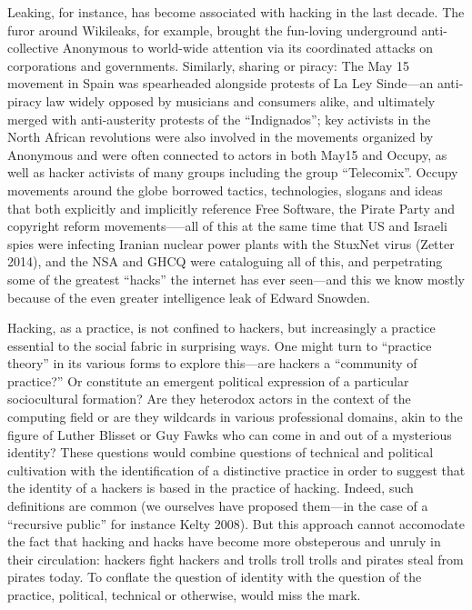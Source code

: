 \documentclass[10pt,letter,oneside]{scrartcl}
\begin{document}
Leaking, for instance, has become associated with hacking in the last decade.
The furor around Wikileaks, for example, brought the fun-loving underground
anti-collective Anonymous to world-wide attention via its coordinated attacks on
corporations and governments.  Similarly, sharing or piracy: The May 15 movement
in Spain was spearheaded alongside protests of La Ley Sinde---an anti-piracy law
widely opposed by musicians and consumers alike, and ultimately merged with
anti-austerity protests of the ``Indignados''; key activists in the North African
revolutions were also involved in the movements organized by Anonymous and were 
often connected to actors in both May15 and Occupy, as well as hacker activists
of many groups including the group ``Telecomix''.  Occupy movements around the 
globe borrowed tactics, technologies, slogans and ideas that both explicitly and
 implicitly reference Free Software, the Pirate Party and copyright reform
movements—--all of this at the same time that US and Israeli spies were
infecting Iranian nuclear power plants with the StuxNet virus (Zetter 2014), and
the NSA and GHCQ were cataloguing all of this, and perpetrating some of the
greatest ``hacks'' the internet has ever seen---and this we know mostly because of
the even greater intelligence leak of Edward Snowden.

Hacking, as a practice, is not confined to hackers, but increasingly a practice
essential to the social fabric in surprising ways.  One might turn to ``practice
theory'' in its various forms to explore this---are hackers a ``community of
practice?'' Or constitute an emergent political expression of a particular 
sociocultural formation? Are they heterodox actors in the context of the computing
field or are they wildcards in various professional domains, akin to the figure of
Luther Blisset or Guy Fawks who can come in and out of a mysterious identity?  
These questions would combine questions of technical and political cultivation with
the identification of a distinctive practice in order to suggest that the identity of 
a hackers is based in the practice of hacking.  Indeed, such definitions are common 
(we ourselves have proposed them---in the case of a ``recursive public'' for instance Kelty 2008).  But this approach cannot accomodate the fact that hacking and hacks 
have become more obsteperous and unruly in their circulation: hackers fight hackers 
and trolls troll trolls and pirates steal from pirates today.  To conflate the 
question of identity with the question of the practice, political, technical or
otherwise, would miss the mark.
\end{document}
